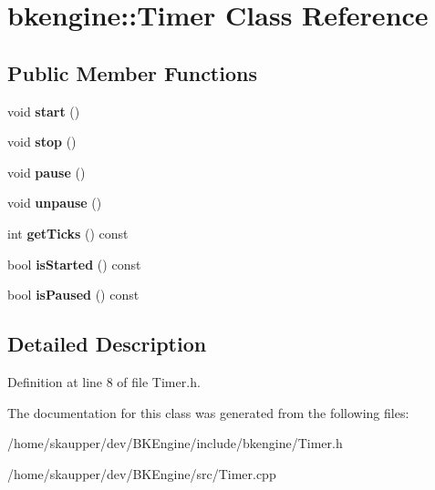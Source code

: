 \hypertarget{classbkengine_1_1Timer}{}\section{bkengine\+:\+:Timer Class Reference}
\label{classbkengine_1_1Timer}
\subsection*{Public Member Functions}
\begin{DoxyCompactItemize}
\item 
\mbox{\label{classbkengine_1_1Timer_a3a8b5272198d029779dc9302a54305a8}} 
void {\bfseries start} ()
\item 
\mbox{\label{classbkengine_1_1Timer_a63f0eb44b27402196590a03781515dba}} 
void {\bfseries stop} ()
\item 
\mbox{\label{classbkengine_1_1Timer_a0289effad7b573c508bc27e405900a23}} 
void {\bfseries pause} ()
\item 
\mbox{\label{classbkengine_1_1Timer_aa4dd50d7ed48ac73efed2950749d35d6}} 
void {\bfseries unpause} ()
\item 
\mbox{\label{classbkengine_1_1Timer_a867fa6b90d7e3e0595e1469450b95210}} 
int {\bfseries get\+Ticks} () const
\item 
\mbox{\label{classbkengine_1_1Timer_ac52c3294294bd363fa029bf382dab204}} 
bool {\bfseries is\+Started} () const
\item 
\mbox{\label{classbkengine_1_1Timer_ad5a769d16483dde076721b30bfdbeb73}} 
bool {\bfseries is\+Paused} () const
\end{DoxyCompactItemize}


\subsection{Detailed Description}


Definition at line 8 of file Timer.\+h.



The documentation for this class was generated from the following files\+:\begin{DoxyCompactItemize}
\item 
/home/skaupper/dev/\+B\+K\+Engine/include/bkengine/Timer.\+h\item 
/home/skaupper/dev/\+B\+K\+Engine/src/Timer.\+cpp\end{DoxyCompactItemize}
